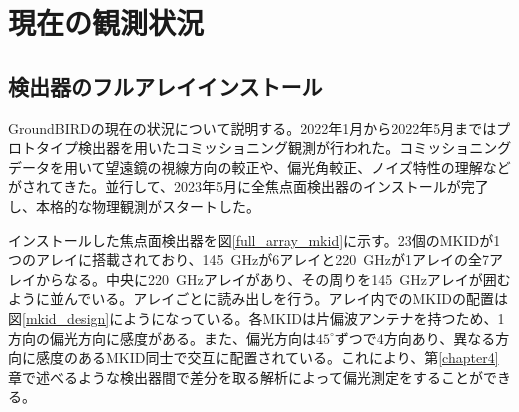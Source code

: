 \section{現在の観測状況}

\subsection{検出器のフルアレイインストール}
\label{full_array}
GroundBIRDの現在の状況について説明する。2022年1月から2022年5月まではプロトタイプ検出器を用いたコミッショニング観測が行われた。コミッショニングデータを用いて望遠鏡の視線方向の較正\cite{sueno_paper}や、偏光角較正、ノイズ特性の理解\cite{sueno_doctor}などがされてきた。並行して、2023年5月に全焦点面検出器のインストールが完了し、本格的な物理観測がスタートした。

インストールした焦点面検出器を図\ref{full_array_mkid}に示す。23個のMKIDが1つのアレイに搭載されており、\SI{145}{GHz}が6アレイと\SI{220}{GHz}が1アレイの全7アレイからなる。中央に\SI{220}{GHz}アレイがあり、その周りを\SI{145}{GHz}アレイが囲むように並んでいる。アレイごとに読み出しを行う。アレイ内でのMKIDの配置は図\ref{mkid_design}にようになっている。各MKIDは片偏波アンテナを持つため、1方向の偏光方向に感度がある。また、偏光方向は$45^{\circ}$ずつで4方向あり、異なる方向に感度のあるMKID同士で交互に配置されている。これにより、第\ref{chapter4}章で述べるような検出器間で差分を取る解析によって偏光測定をすることができる。

